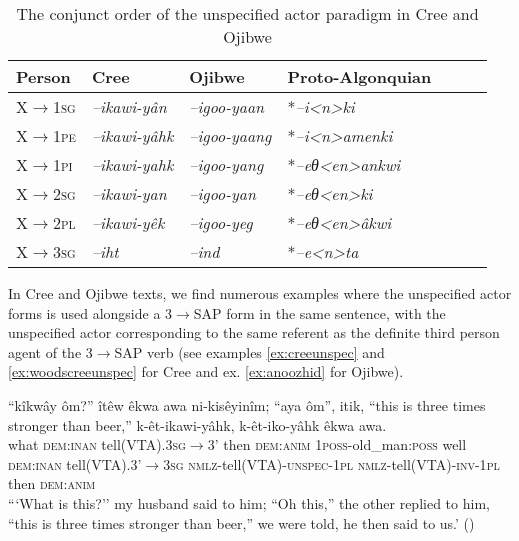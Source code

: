 \documentclass[twoside,a4paper,11pt]{article}
\newcommand{\ipa}[1]{{\phon\textit{#1}}}
\newcommand{\sg}{\textsc{sg}}
\newcommand{\pl}{\textsc{pl}}
\newcommand{\grise}[1]{\cellcolor{lightgray}\textbf{#1}}
\newcommand{\Σ}{\greek{Σ}}
\newcommand{\anim}{\textsc{anim}}
\newcommand{\dem}{\textsc{dem}}
\newcommand{\inan}{\textsc{inan}}
\newcommand{\inv}{\textsc{inv}}
\newcommand{\nmlz}{\textsc{nmlz}}
\newcommand{\pli}{\textsc{pi}}
\newcommand{\pe}{\textsc{pe}}
\newcommand{\poss}{\textsc{poss}}
\newcommand{\unspec}{\textsc{unspec}}
\begin{document}
\begin{table}[htbp]
\caption{The conjunct order of the unspecified actor paradigm in Cree and Ojibwe} \label{tab:unspec} \centering
\begin{tabular}{lllllll}
\toprule
Person &   Cree & Ojibwe      &Proto-Algonquian\\
\midrule
X$\rightarrow$1\sg& \ipa{--ikawi-yân} \grise{} &\ipa{--igoo-yaan} \grise{}  & *\ipa{--i<n>ki} \\
X$\rightarrow$1\pe & \ipa{--ikawi-yâhk} \grise{}   &\ipa{--igoo-yaang} \grise{}  & *\ipa{--i<n>amenki} \\
X$\rightarrow$1\pli & \ipa{--ikawi-yahk} \grise{}  &\ipa{--igoo-yang} \grise{}  & *\ipa{--eθ<en>ankwi} \\
\midrule
X$\rightarrow$2\sg& \ipa{--ikawi-yan} \grise{} &\ipa{--igoo-yan} \grise{}  & *\ipa{--eθ<en>ki} \\
X$\rightarrow$2\pl& \ipa{--ikawi-yêk} \grise{} &\ipa{--igoo-yeg} \grise{}  & *\ipa{--eθ<en>âkwi}  \\
\midrule
X$\rightarrow$3\sg& \ipa{--iht}   &\ipa{--ind}  & *\ipa{--e<n>ta} \\
\bottomrule
\end{tabular}
\end{table}

In Cree and Ojibwe texts, we find numerous examples where the unspecified actor forms is used alongside a 3$\rightarrow$SAP form in the same sentence, with the unspecified actor corresponding to the same referent as  the definite third person agent of the 3$\rightarrow$SAP verb (see examples \ref{ex:creeunspec} and \ref{ex:woodscreeunspec} for Cree and ex. \ref{ex:anoozhid} for Ojibwe).


\begin{exe}
 \ex \label{ex:creeunspec}
\gll ``kîkwây ôm?'' îtêw êkwa awa ni-kisêyinîm; ``aya ôm'', itik, {\rm``this is three times stronger than beer,''} k-êt-ikawi-yâhk, k-êt-iko-yâhk êkwa awa.\\
what {\dem{:}\inan} {tell(VTA).3\sg$\rightarrow$3'} then {\dem{:}\anim} {1\poss-old\_man{:}\poss} well {\dem{:}\inan} {tell(VTA).3'$\rightarrow$3\sg} {} {\nmlz-tell(VTA)-\unspec-1\pl} {\nmlz-tell(VTA)-\inv-1\pl} then {\dem{:}\anim}\\
\glt ```What is this?'' my husband said to him; ``Oh this,'' the other replied to him, ``this is three times stronger than beer,'' we were told, he then said to us.' (\citealp[p. 57]{bothsides})
\end{exe}
\end{document}

